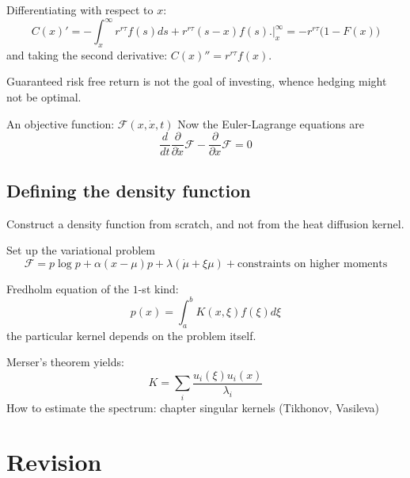 \documentclass[a4paper]{article}
\newcommand{\Fcal}{\mathcal{F}}
\begin{document}
Differentiating with respect to $x$:
\[C(x)' = -\int_x^\infty r^{r\tau} f(s) ds + r^{r\tau} (s-x) f(s)\Big.\Big\rvert_x^\infty = -r^{r\tau} \big( 1 - F(x) \big) \]
and taking the second derivative: $C(x)'' = r^{r\tau} f(x)$.

Guaranteed risk free return is not the goal of investing, whence hedging might not be optimal.

An objective function: $\Fcal(x, \dot{x}, t)$
Now the Euler-Lagrange equations are
\[\frac{d}{dt}\frac{\partial}{\partial \dot{x}} \Fcal - \frac{\partial}{\partial x} \Fcal = 0\]


\subsection{Defining the density function} %
\label{sub:defining_the_density_function}

Construct a density function from scratch, and not from the heat diffusion kernel.

Set up the variational problem
\[\Fcal = p\log p + \alpha (x-\mu) p + \lambda (\dot{\mu} + \xi \mu) + \text{constraints on higher moments} \]


Fredholm equation of the $1$-st kind:
\[p(x) = \int_a^b K(x,\xi) f(\xi) d\xi \]
the particular kernel depends on the problem itself.

Merser's theorem yields:
\[K = \sum_i \frac{u_i(\xi) u_i(x)}{\lambda_i}\]
How to estimate the spectrum: chapter singular kernels (Tikhonov, Vasileva)



\section{Revision} %
\label{sec:revision}
\end{document}

